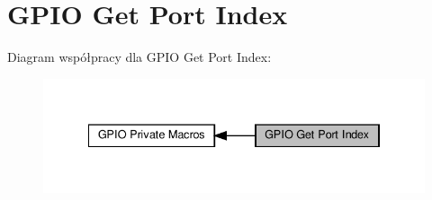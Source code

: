 \hypertarget{group___g_p_i_o_ex___get___port___index}{}\section{G\+P\+IO Get Port Index}
\label{group___g_p_i_o_ex___get___port___index}
Diagram współpracy dla G\+P\+IO Get Port Index\+:\nopagebreak
\begin{figure}[H]
\begin{center}
\leavevmode
\includegraphics[width=334pt]{group___g_p_i_o_ex___get___port___index}
\end{center}
\end{figure}

